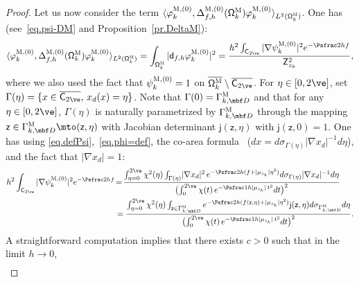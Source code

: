 \begin{proof}
Let us now consider the term $\langle \varphi^{\textsc{M},(0)}_k,\Delta_{f,h}^{\textsc{M}, (0)}(\mathsf \Omega_k^{\textsc{M}}) \varphi^{\textsc{M},(0)}_k \rangle_{L^2(\mathsf \Omega_k^{\textsc{M}})}$. One has (see~\eqref{eq.psi-DM} and Proposition~\ref{pr.DeltaM}):
\begin{align*}
\langle \varphi^{\textsc{M},(0)}_k,\Delta_{f,h}^{\textsc{M}, (0)}(\mathsf \Omega_k^{\textsc{M}}) \varphi^{\textsc{M},(0)}_k \rangle_{L^2(\mathsf \Omega_k^{\textsc{M}})}= \int_{\mathsf \Omega_k^{\textsc{M}}} \vert \mathsf d_{f,h} \varphi^{\textsc{M},(0)}_k \vert^2 = \frac{h^2 \int_{\mathsf C_{2\ve}} \vert \nabla \psi^{\textsc{M},(0)}_k \vert^2 e^{-\Psfrac 2h f} }{\mathsf Z_{z_k}^2},
\end{align*}
where we also used the fact that $\psi^{\textsc{M},(0)}_k=1$ on $
\overline{\mathsf \Omega_k^{\textsc{M}} }\setminus \overline{\mathsf
C_{2\ve}}$. For $\eta\in [0,2\ve]$, set $ \Gamma (\eta)=\{ x
\in\overline{ \mathsf C_{2\ve}},\, x_d(x)=\eta\}$. Note that $ \Gamma
(0)=\Gamma^{\textsc{M}}_{k,\mbf D}$ and that for any $\eta\in
[0,2\ve]$, $\Gamma (\eta)$ is naturally parametrized by
$\Gamma^{\textsc{M}}_{k,\mbf D}$ through the mapping $\mathsf z\in
\Gamma^{\textsc{M}}_{k,\mbf D}\mto (\mathsf z,\eta)$ with Jacobian
determinant $\mathsf j(\mathsf z,\eta)$ with $\mathsf j(\mathsf
z,0)=1$. One has using \eqref{eq.defPsi},~\eqref{eq.phi=def}, the co-area formula~\cite{evans-gariepy-18} ($dx=d\sigma_{\Gamma (\eta)} |\nabla x_d|^{-1} d\eta$), and the fact that
$\vert \nabla x_d\vert=1$:\vspace*{-3pt}
\begin{align*}
{h^2 \int_{\mathsf C_{2\ve}} \vert\nabla \psi^{\textsc{M},(0)}_k \vert^2 e^{-\Psfrac 2h f} } &\!=\! \frac{ \int_{\eta=0}^{2\ve} \chi^2(\eta) \int_{\Gamma (\eta) } \! |\nabla x_d|^2 \, e^{-\Psfrac 2h (f +\vert \mu_{z_k}\vert \eta^2)} d\sigma _{\Gamma (\eta)} |\nabla x_d|^{-1} d\eta }{ \bigl(\int_0^{2\ve}\chi(t)\, e^{-\Psfrac 1h\vert \mu_{z_k}\vert \, t^2} dt\bigr)^2 }\\
&=\frac{ \int_{\eta=0}^{2\ve} \chi^2(\eta) \int_{\mathsf z \in \Gamma_{k,\mbf D}^{\textsc{M}} } e^{-\Psfrac 2h (f(\mathsf z,\eta) +\vert \mu_{z_k}\vert \eta^2)} \mathsf j(\mathsf z,\eta) d\sigma _{\Gamma^{\textsc{M}}_{k,\mbf D}} d\eta }{ \bigl(\int_0^{2\ve}\chi(t)\, e^{-\Psfrac 1h\vert \mu_{z_k}\vert \, t^2} dt\bigr)^2 }.
\end{align*}
A straightforward computation implies that there exists $c>0$ such that in
the limit $h\to 0$,\vspace*{-3pt}
\begin{align}\label{eq.chiUU2}

\end{align}
\end{proof}
